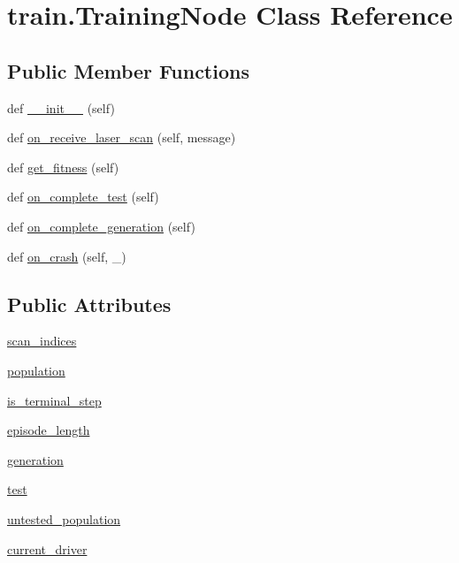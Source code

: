 \hypertarget{classtrain_1_1_training_node}{}\section{train.\+Training\+Node Class Reference}
\label{classtrain_1_1_training_node}
\subsection*{Public Member Functions}
\begin{DoxyCompactItemize}
\item 
def \hyperlink{classtrain_1_1_training_node_ad96f8dcaf361b62d52b808eb0dd7e800}{\+\_\+\+\_\+init\+\_\+\+\_\+} (self)
\item 
def \hyperlink{classtrain_1_1_training_node_a067b96ed2965a0c7daf88827858d4a66}{on\+\_\+receive\+\_\+laser\+\_\+scan} (self, message)
\item 
def \hyperlink{classtrain_1_1_training_node_a3779924e099cc6fe56ba071a9c21ef88}{get\+\_\+fitness} (self)
\item 
def \hyperlink{classtrain_1_1_training_node_af54dce4a778ce1074d412abd1b541c28}{on\+\_\+complete\+\_\+test} (self)
\item 
def \hyperlink{classtrain_1_1_training_node_af31435707c74d9b609075e225b65e8cb}{on\+\_\+complete\+\_\+generation} (self)
\item 
def \hyperlink{classtrain_1_1_training_node_a527f3ba275a347fc27afe25b4cf14d5a}{on\+\_\+crash} (self, \+\_\+)
\end{DoxyCompactItemize}
\subsection*{Public Attributes}
\begin{DoxyCompactItemize}
\item 
\hyperlink{classtrain_1_1_training_node_adc0b51385828f502a6394aadc342eb56}{scan\+\_\+indices}
\item 
\hyperlink{classtrain_1_1_training_node_a73a06dfa3230d4f26cc9767488b30385}{population}
\item 
\hyperlink{classtrain_1_1_training_node_aa17107636d9a2df25960aa1076d9b987}{is\+\_\+terminal\+\_\+step}
\item 
\hyperlink{classtrain_1_1_training_node_a58926a0e5681d22983ca345ebb7771bd}{episode\+\_\+length}
\item 
\hyperlink{classtrain_1_1_training_node_a3ba5470e3146e9bb1303ed906b868d28}{generation}
\item 
\hyperlink{classtrain_1_1_training_node_a26350a860e1c0aaf7653da42c55fa93a}{test}
\item 
\hyperlink{classtrain_1_1_training_node_a6724c3a14d24c6d8d6a4d7e29126627f}{untested\+\_\+population}
\item 
\hyperlink{classtrain_1_1_training_node_a81d0481151f7b23e6489027fa1a87e47}{current\+\_\+driver}
\end{DoxyCompactItemize}



